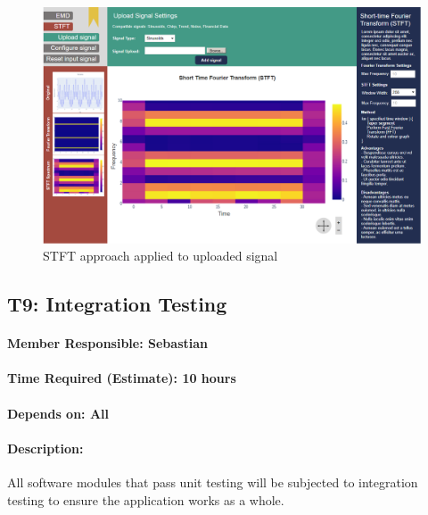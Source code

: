 \documentclass[
  english,
  paper=a4,
  oneside  ,captions=tableheading
]{scrbook}
\begin{document}
\begin{figure}
\centering
\includegraphics{img/STFT_upload.PNG}
\caption{STFT approach applied to uploaded signal}
\end{figure}

\newpage
\hypertarget{t9-integration-testing}{%
\subsection{T9: Integration Testing}\label{t9-integration-testing}}

\hypertarget{member-responsible-sebastian}{%
\paragraph{Member Responsible:
Sebastian}\label{member-responsible-sebastian}}

\hypertarget{time-required-estimate-10-hours}{%
\paragraph{Time Required (Estimate): 10 hours}\label{time-required-estimate-10-hours}}

\hypertarget{depends-on-all}{%
\paragraph{Depends on: All}\label{depends-on-all}}

\hypertarget{description-7}{%
\paragraph{Description:}\label{description-7}}

All software modules that pass unit testing will be subjected to
integration testing to ensure the application works as a whole.
\end{document}
